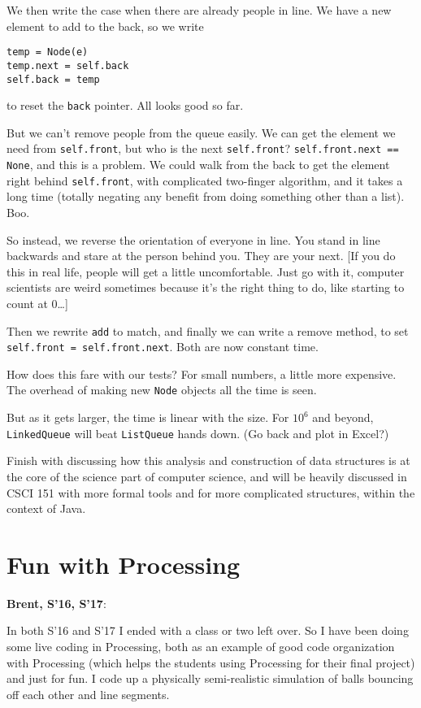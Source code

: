 \documentclass{article}
\newenvironment{reflect}[1]
{
  \noindent
  \begin{lrbox}{\reflectbox}
    \begin{minipage}[t]{\textwidth}
      \textbf{#1}:
}{
    \end{minipage}
  \end{lrbox}
  \fbox{\usebox{\reflectbox}}
}
\begin{document}
We then write the case when there are already people in line. We have a new
element to add to the back, so we write

\begin{verbatim}
temp = Node(e)
temp.next = self.back
self.back = temp
\end{verbatim}
to reset the \verb|back| pointer. All looks good so far.

But we can't remove people from the queue easily. We can get the
element we need from \verb|self.front|, but who is the next
\verb|self.front|? \verb|self.front.next == None|, and this is a problem. We
could walk from the back to get the element right behind \verb|self.front|,
with complicated two-finger algorithm, and it takes a long time
(totally negating any benefit from doing something other than a
list). Boo.

So instead, we reverse the orientation of everyone in line. You stand in
line backwards and stare at the person behind you. They are your next. [If
you do this in real life, people will get a little uncomfortable. Just go
with it, computer scientists are weird sometimes because it's the right
thing to do, like starting to count at 0\dots]

Then we rewrite \verb|add| to match, and finally we can write a remove
method, to set \verb|self.front = self.front.next|.  Both are now
constant time.

How does this fare with our tests? For small numbers, a little more
expensive. The overhead of making new \verb|Node| objects all the time
is seen.

But as it gets larger, the time is linear with the size. For $10^6$
and beyond, \verb|LinkedQueue| will beat \verb|ListQueue| hands
down. (Go back and plot in Excel?)

Finish with discussing how this analysis and construction of data
structures is at the core of the science part of computer science, and will
be heavily discussed in CSCI 151 with more formal tools and for more
complicated structures, within the context of Java.

\section{Fun with Processing}

\begin{reflect}{Brent, S'16, S'17}
  In both S'16 and S'17 I ended with a class or two left over.  So I
  have been doing some live coding in Processing, both as an example
  of good code organization with Processing (which helps the students
  using Processing for their final project) and just for fun.  I code
  up a physically semi-realistic simulation of balls bouncing off each
  other and line segments.
\end{reflect}
\end{document}
